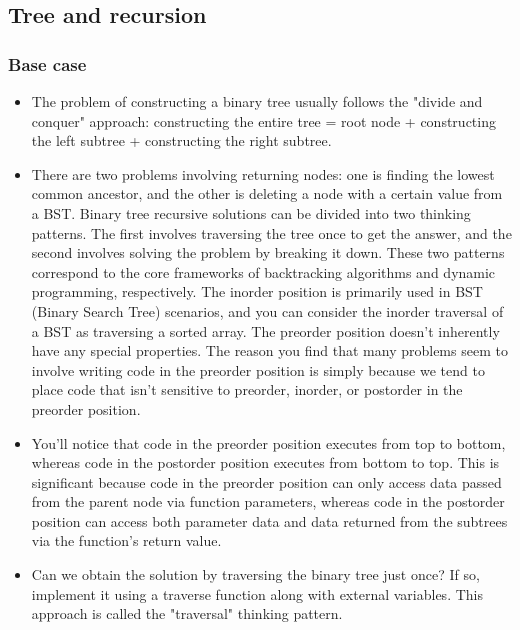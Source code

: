 \documentclass[a4paper,11pt,twoside]{book}
\begin{document}
\subsection{Tree and recursion} 
\subsubsection{Base case}


\begin{itemize}
	

\item The problem of constructing a binary tree usually follows the "divide and conquer" approach: constructing the entire tree = root node + constructing the left subtree + constructing the right subtree.

\item There are two problems involving returning nodes: one is finding the lowest common ancestor, and the other is deleting a node with a certain value from a BST.
Binary tree recursive solutions can be divided into two thinking patterns. The first involves traversing the tree once to get the answer, and the second involves solving the problem by breaking it down. These two patterns correspond to the core frameworks of backtracking algorithms and dynamic programming, respectively.
The inorder position is primarily used in BST (Binary Search Tree) scenarios, and you can consider the inorder traversal of a BST as traversing a sorted array.
The preorder position doesn’t inherently have any special properties. The reason you find that many problems seem to involve writing code in the preorder position is simply because we tend to place code that isn’t sensitive to preorder, inorder, or postorder in the preorder position.

\item You’ll notice that code in the preorder position executes from top to bottom, whereas code in the postorder position executes from bottom to top. This is significant because code in the preorder position can only access data passed from the parent node via function parameters, whereas code in the postorder position can access both parameter data and data returned from the subtrees via the function's return value.
	
\item Can we obtain the solution by traversing the binary tree just once? If so, implement it using a traverse function along with external variables. This approach is called the "traversal" thinking pattern.


\end{itemize}
\end{document}
